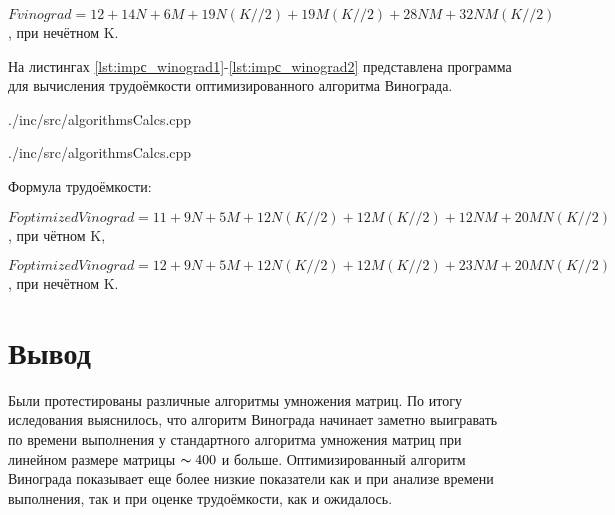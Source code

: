 $Fvinograd = 12+14N+6M+19N(K//2)+19M(K//2)+28NM+32NM(K//2)$,  при нечётном K.

На листингах \ref{lst:impс_winograd1}-\ref{lst:impс_winograd2} представлена программа для вычисления трудоёмкости оптимизированного алгоритма Винограда.

\begin{lstinputlisting}[
	caption={Вычисление трудоёмкости оптимизированного алгоритма Винограда, часть 1},
	label={lst:impс_winograd1},
	style={c},
	linerange={102-142},
	]{./inc/src/algorithmsCalcs.cpp}
\end{lstinputlisting}

\begin{lstinputlisting}[
	caption={Вычисление трудоёмкости оптимизированного алгоритма Винограда, часть 2},
	label={lst:impс_winograd2},
	style={c},
	linerange={144-172},
	]{./inc/src/algorithmsCalcs.cpp}
\end{lstinputlisting}

Формула трудоёмкости:

$FoptimizedVinograd = 11+9N+5M+12N(K//2)+12M(K//2)+12NM+20MN(K//2)$,  при чётном K,

$FoptimizedVinograd = 12+9N+5M+12N(K//2)+12M(K//2)+23NM+20MN(K//2)$,  при нечётном K.

\section{Вывод}
Были протестированы различные алгоритмы умножения матриц. По итогу иследования выяснилось, что алгоритм Винограда начинает заметно выигравать по времени выполнения у стандартного алгоритма умножения матриц при линейном размере матрицы $\thicksim400$ и больше. Оптимизированный алгоритм Винограда показывает еще более низкие показатели как и при анализе времени выполнения, так и при оценке трудоёмкости, как и ожидалось.
